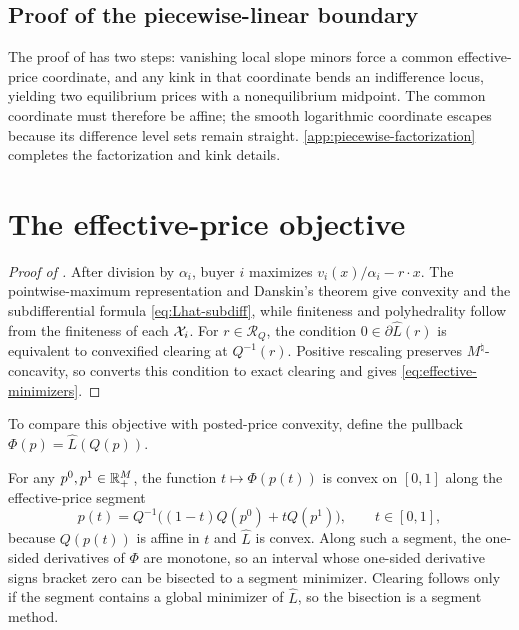 \subsection{Proof of the piecewise-linear boundary}\label{subsec:piecewise}

The proof of  has two steps: vanishing local slope minors force a common effective-price coordinate, and any kink in that coordinate bends an indifference locus, yielding two equilibrium prices with a nonequilibrium midpoint. The common coordinate must therefore be affine; the smooth logarithmic coordinate escapes because its difference level sets remain straight. \ref{app:piecewise-factorization} completes the factorization and kink details.

\section{The effective-price objective}\label{sec:effective}

\begin{proof}[Proof of ]
After division by $\alpha_i$, buyer $i$ maximizes $v_i(x)/\alpha_i-r\cdot x$. The pointwise-maximum representation and Danskin's theorem give convexity and the subdifferential formula \eqref{eq:Lhat-subdiff}, while finiteness and polyhedrality follow from the finiteness of each $\mathcal{X}_i$. For $r\in\mathcal R_Q$, the condition $0\in\partial\widehat L(r)$ is equivalent to convexified clearing at $Q^{-1}(r)$. Positive rescaling preserves $M^\natural$-concavity, so  converts this condition to exact clearing and gives \eqref{eq:effective-minimizers}.
\end{proof}

To compare this objective with posted-price convexity, define the pullback $\Phi(p)=\widehat L(Q(p))$.

For any $p^0,p^1\in\mathbb{R}_+^M$, the function $t\mapsto\Phi(p(t))$ is convex on $[0,1]$ along the effective-price segment
\begin{equation}\label{eq:geodesic}
p(t)=Q^{-1}\big((1-t)Q(p^0)+tQ(p^1)\big),
\qquad t\in[0,1],
\end{equation}
because $Q(p(t))$ is affine in $t$ and $\widehat L$ is convex. Along such a segment, the one-sided derivatives of $\Phi$ are monotone, so an interval whose one-sided derivative signs bracket zero can be bisected to a segment minimizer. Clearing follows only if the segment contains a global minimizer of $\widehat L$, so the bisection is a segment method.


